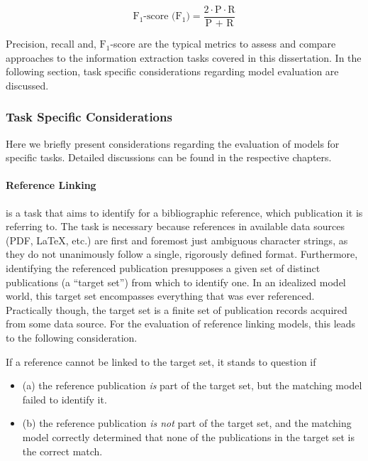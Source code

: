 \begin{equation*}
\text{$\text{F}_1$-score ($\text{F}_1$)} = \frac{2 \cdot \text{P} \cdot \text{R}}{\text{P + R}}
\end{equation*}

Precision, recall and, $\text{F}_1$-score are the typical metrics to assess and compare approaches to the information extraction tasks covered in this dissertation. In the following section, task specific considerations regarding model evaluation are discussed.


\subsubsection{Task Specific Considerations}

Here we briefly present considerations regarding the evaluation of models for specific tasks. Detailed discussions can be found in the respective chapters.

\paragraph{Reference Linking}
is a task that aims to identify for a bibliographic reference, which publication it is referring to. The task is necessary because references in available data sources (PDF, \LaTeX, etc.) are first and foremost just ambiguous character strings, as they do not unanimously follow a single, rigorously defined format. Furthermore, identifying the referenced publication presupposes a given set of distinct publications (a ``target set'') from which to identify one. In an idealized model world, this target set encompasses everything that was ever referenced. Practically though, the target set is a finite set of publication records acquired from some data source. For the evaluation of reference linking models, this leads to the following consideration.

If a reference cannot be linked to the target set, it stands to question if
\begin{itemize}
    \item (a) the reference publication \emph{is} part of the target set, but the matching model failed to identify it.
    \item (b) the reference publication \emph{is not} part of the target set, and the matching model correctly determined that none of the publications in the target set is the correct match.
\end{itemize}

